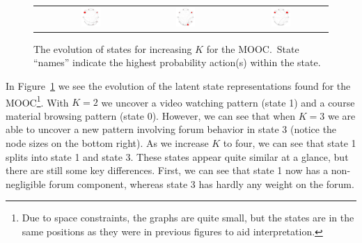 \begin{figure}
\begin{tabular}{cccc}
    &
    \includegraphics[width=0.22\textwidth]{figures/text-4state/state1.png}
    &
    \includegraphics[width=0.22\textwidth]{figures/text-4state/state2.png}
    &
    \includegraphics[width=0.22\textwidth]{figures/text-4state/state3.png}
  \end{tabular}
  \caption{The evolution of states for increasing $K$ for the
  \protect\textretrieval{} MOOC.\ State ``names'' indicate the highest
  probability action(s) within the state.} %
  \label{fig:text-state-evolution}
\end{figure}

In Figure~\ref{fig:text-state-evolution} we see the evolution of the latent
state representations found for the \textretrieval{} MOOC\footnote{Due to
space constraints, the graphs are quite small, but the states are in the
same positions as they were in previous figures to aid interpretation.}.
With $K=2$ we uncover a video watching pattern (state 1) and a course
material browsing pattern (state 0). However, we can see that when $K=3$ we
are able to uncover a new pattern involving forum behavior in state 3
(notice the node sizes on the bottom right). As we increase $K$ to four, we
can see that state 1 splits into state 1 and state 3. These states appear
quite similar at a glance, but there are still some key differences. First,
we can see that state 1 now has a non-negligible forum component, whereas
state 3 has hardly any weight on the forum.

